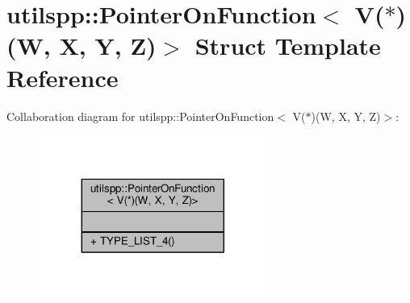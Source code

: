 \hypertarget{structutilspp_1_1PointerOnFunction_3_01V_07_5_08_07W_00_01X_00_01Y_00_01Z_08_4}{\section{utilspp\-:\-:Pointer\-On\-Function$<$ V($\ast$)(W, X, Y, Z)$>$ Struct Template Reference}
\label{structutilspp_1_1PointerOnFunction_3_01V_07_5_08_07W_00_01X_00_01Y_00_01Z_08_4}
}


Collaboration diagram for utilspp\-:\-:Pointer\-On\-Function$<$ V($\ast$)(W, X, Y, Z)$>$\-:\nopagebreak
\begin{figure}[H]
\begin{center}
\leavevmode
\includegraphics[width=212pt]{structutilspp_1_1PointerOnFunction_3_01V_07_5_08_07W_00_01X_00_01Y_00_01Z_08_4__coll__graph}
\end{center}
\end{figure}
